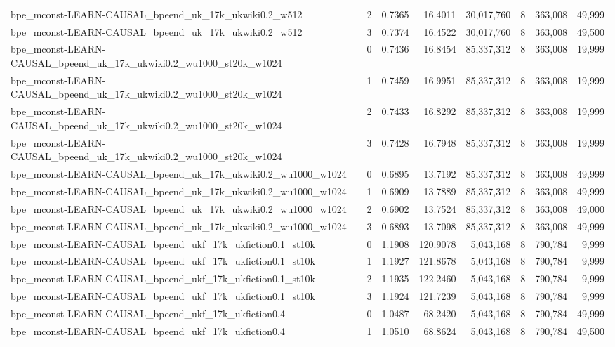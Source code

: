 \begin{tabular}{lrrrrrrr}
bpe\_mconst-LEARN-CAUSAL\_bpeend\_uk\_17k\_ukwiki0.2\_w512 & 2 & 0.7365 & 16.4011 & 30,017,760 & 8 & 363,008 & 49,999 \\
bpe\_mconst-LEARN-CAUSAL\_bpeend\_uk\_17k\_ukwiki0.2\_w512 & 3 & 0.7374 & 16.4522 & 30,017,760 & 8 & 363,008 & 49,500 \\
bpe\_mconst-LEARN-CAUSAL\_bpeend\_uk\_17k\_ukwiki0.2\_wu1000\_st20k\_w1024 & 0 & 0.7436 & 16.8454 & 85,337,312 & 8 & 363,008 & 19,999 \\
bpe\_mconst-LEARN-CAUSAL\_bpeend\_uk\_17k\_ukwiki0.2\_wu1000\_st20k\_w1024 & 1 & 0.7459 & 16.9951 & 85,337,312 & 8 & 363,008 & 19,999 \\
bpe\_mconst-LEARN-CAUSAL\_bpeend\_uk\_17k\_ukwiki0.2\_wu1000\_st20k\_w1024 & 2 & 0.7433 & 16.8292 & 85,337,312 & 8 & 363,008 & 19,999 \\
bpe\_mconst-LEARN-CAUSAL\_bpeend\_uk\_17k\_ukwiki0.2\_wu1000\_st20k\_w1024 & 3 & 0.7428 & 16.7948 & 85,337,312 & 8 & 363,008 & 19,999 \\
bpe\_mconst-LEARN-CAUSAL\_bpeend\_uk\_17k\_ukwiki0.2\_wu1000\_w1024 & 0 & 0.6895 & 13.7192 & 85,337,312 & 8 & 363,008 & 49,999 \\
bpe\_mconst-LEARN-CAUSAL\_bpeend\_uk\_17k\_ukwiki0.2\_wu1000\_w1024 & 1 & 0.6909 & 13.7889 & 85,337,312 & 8 & 363,008 & 49,999 \\
bpe\_mconst-LEARN-CAUSAL\_bpeend\_uk\_17k\_ukwiki0.2\_wu1000\_w1024 & 2 & 0.6902 & 13.7524 & 85,337,312 & 8 & 363,008 & 49,000 \\
bpe\_mconst-LEARN-CAUSAL\_bpeend\_uk\_17k\_ukwiki0.2\_wu1000\_w1024 & 3 & 0.6893 & 13.7098 & 85,337,312 & 8 & 363,008 & 49,999 \\
bpe\_mconst-LEARN-CAUSAL\_bpeend\_ukf\_17k\_ukfiction0.1\_st10k & 0 & 1.1908 & 120.9078 & 5,043,168 & 8 & 790,784 & 9,999 \\
bpe\_mconst-LEARN-CAUSAL\_bpeend\_ukf\_17k\_ukfiction0.1\_st10k & 1 & 1.1927 & 121.8678 & 5,043,168 & 8 & 790,784 & 9,999 \\
bpe\_mconst-LEARN-CAUSAL\_bpeend\_ukf\_17k\_ukfiction0.1\_st10k & 2 & 1.1935 & 122.2460 & 5,043,168 & 8 & 790,784 & 9,999 \\
bpe\_mconst-LEARN-CAUSAL\_bpeend\_ukf\_17k\_ukfiction0.1\_st10k & 3 & 1.1924 & 121.7239 & 5,043,168 & 8 & 790,784 & 9,999 \\
bpe\_mconst-LEARN-CAUSAL\_bpeend\_ukf\_17k\_ukfiction0.4 & 0 & 1.0487 & 68.2420 & 5,043,168 & 8 & 790,784 & 49,999 \\
bpe\_mconst-LEARN-CAUSAL\_bpeend\_ukf\_17k\_ukfiction0.4 & 1 & 1.0510 & 68.8624 & 5,043,168 & 8 & 790,784 & 49,500 \\

\end{tabular}
